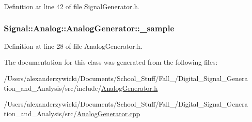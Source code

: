 Definition at line 42 of file Signal\+Generator.\+h.

\hypertarget{classSignal_1_1Analog_1_1AnalogGenerator_a8750d751c4dbc67084dfc74ab9a6a763}{
\subsubsection[{\+\_\+sample}]{ Signal\+::\+Analog\+::\+Analog\+Generator\+::\+\_\+sample\hspace{0.3cm}{\ttfamily [protected]}}}\label{classSignal_1_1Analog_1_1AnalogGenerator_a8750d751c4dbc67084dfc74ab9a6a763}


Definition at line 28 of file Analog\+Generator.\+h.



The documentation for this class was generated from the following files\+:\begin{DoxyCompactItemize}
\item 
/\+Users/alexanderzywicki/\+Documents/\+School\+\_\+\+Stuff/\+Fall\+\_/\+Digital\+\_\+\+Signal\+\_\+\+Generation\+\_\+and\+\_\+\+Analysis/src/include/\hyperlink{AnalogGenerator_8h}{Analog\+Generator.\+h}\item 
/\+Users/alexanderzywicki/\+Documents/\+School\+\_\+\+Stuff/\+Fall\+\_/\+Digital\+\_\+\+Signal\+\_\+\+Generation\+\_\+and\+\_\+\+Analysis/src/\hyperlink{AnalogGenerator_8cpp}{Analog\+Generator.\+cpp}\end{DoxyCompactItemize}

